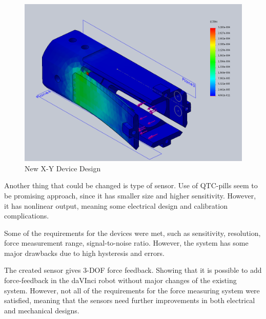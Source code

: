 \begin{figure}[h]
	\begin{center}
		\includegraphics[width=120mm]{fig/methods/NEW_SLEEVE_STRAIN.png}
	\end{center}
	\vspace{-4mm}
	\caption[New X-Y Device Design]
	{New X-Y Device Design}
	\label{fig:NewXYDesign}
	\vspace{-2mm}
\end{figure}

Another thing that could be changed is type of sensor. Use of QTC-pills seem to be promising approach, since it has smaller size and higher sensitivity. However, it has nonlinear output, meaning some electrical design and calibration complications.

Some of the requirements for the devices were met, such as sensitivity, resolution, force measurement range, signal-to-noise ratio. However, the system has some major drawbacks due to high hysteresis and errors.

The created sensor gives 3-DOF force feedback. Showing that it is possible to add force-feedback in the daVInci robot without major changes of the existing system. However, not all of the requirements for the force measuring system were satisfied, meaning that the sensors need further improvements in both electrical and mechanical designs.